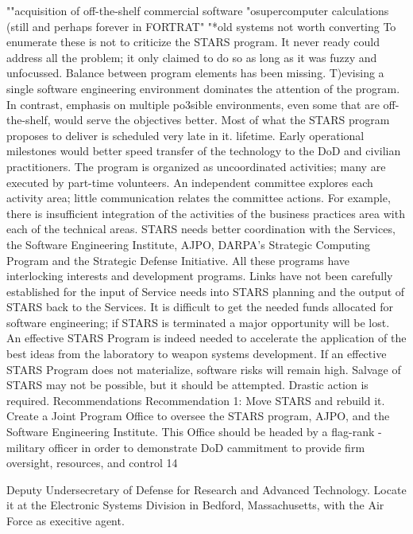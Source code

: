 \documentclass[12pt]{article}
\begin{document}
""acquisition of off-the-shelf commercial software
"osupercomputer calculations (still and perhaps forever in FORTRAT"
"*old systems not worth converting
To enumerate these is not to criticize the STARS program. It never ready could address
all the problem; it only claimed to do so as long as it was fuzzy and unfocussed.
Balance between program elements has been missing.
T)evising a single software engineering environment dominates the attention of the
program. In contrast, emphasis on multiple po3sible environments, even some that are
off-the-shelf, would serve the objectives better. Most of what the STARS program proposes
to deliver is scheduled very late in it. lifetime. Early operational milestones would better
speed transfer of the technology to the DoD and civilian practitioners.
The program is organized as uncoordinated activities; many are executed
by part-time volunteers.
An independent committee explores each activity area; little communication relates
the committee actions. For example, there is insufficient integration of the activities of the
business practices area with each of the technical areas.
STARS needs better coordination with the Services, the Software Engineering Institute, AJPO, DARPA's Strategic Computing Program and the
Strategic Defense Initiative.
All these programs have interlocking interests and development programs. Links have
not been carefully established for the input of Service needs into STARS planning and the
output of STARS back to the Services.
It is difficult to get the needed funds allocated for software engineering; if
STARS is terminated a major opportunity will be lost.
An effective STARS Program is indeed needed to accelerate the application of the best
ideas from the laboratory to weapon systems development. If an effective STARS Program
does not materialize, software risks will remain high.
Salvage of STARS may not be possible, but it should be attempted. Drastic
action is required.
Recommendations
Recommendation 1: Move STARS and rebuild it.
Create a Joint Program Office to oversee the STARS program, AJPO, and the Software
Engineering Institute. This Office should be headed by a flag-rank -military officer in
order to demonstrate DoD cammitment to provide firm oversight, resources, and control
14

Deputy Undersecretary of Defense for Research and Advanced Technology. Locate it at
the Electronic Systems Division in Bedford, Massachusetts, with the Air Force as execitive
agent.
\end{document}
